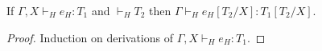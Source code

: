 \begin{htes}
\label{htes}
If $\Gamma,X\vdash_{H}e_{H}:T_{1}$ and $\vdash_{H}T_{2}$ then $\Gamma\vdash_{H}e_{H}[T_{2}/X]:T_{1}[T_{2}/X]$.
\begin{proof}
Induction on derivations of $\Gamma,X\vdash_{H}e_{H}:T_{1}$.
\end{proof}
\end{htes}